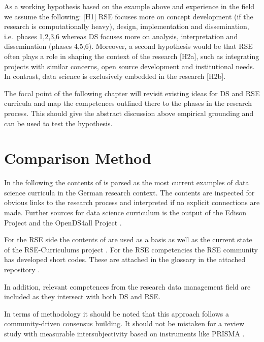 \documentclass[
        english,biblatex
    ]{lni}
\begin{document}
    As a working hypothesis based on the example above and experience in
    the field we assume the following: {[}H1{]} RSE focuses more on
    concept development (if the research is computationally heavy),
    design, implementation and dissemination, i.e.~phases 1,2,3,6
    whereas DS focuses more on analysis, interpretation and
    dissemination (phases 4,5,6). Moreover, a second hypothesis would be
    that RSE often plays a role in shaping the context of the research
    {[}H2a{]}, such as integrating projects with similar concerns, open
    source development and institutional needs. In contrast, data
    science is exclusively embedded in the research {[}H2b{]}.

    The focal point of the following chapter will revisit existing ideas
    for DS and RSE curricula and map the competences outlined there to
    the phases in the research process. This should give the abstract
    discussion above empirical grounding and can be used to test the
    hypothesis.

    \section{Comparison Method}\label{comparison-method}

    In the following the contents of \autocite{GI2021DataScience} is
    parsed as the most current examples of data science curricula in the
    German research context. The contents are inspected for obvious
    links to the research process and interpreted if no explicit
    connections are made. Further sources for data science curriculum is
    the output of the Edison Project \autocite{EDSF2017} and the
    OpenDS4all Project \autocite{OpenDS4All2020}.

    For the RSE side the contents of \autocite{Goth2024RSE} are used as
    a basis as well as the current state of the RSE-Curriculums project
    \autocite{RSECurriculums2021}. For the RSE competencies the RSE
    community has developed short codes. These are attached in the
    glossary in the attached repository \autocite{ds2rse2025}.

    In addition, relevant competences from the research data management
    field \autocite{petersen_2025_15025246} are included as they
    intersect with both DS and RSE.

    In terms of methodology it should be noted that this approach
    follows a community-driven consensus building. It should not be
    mistaken for a review study with measurable intersubjectivity based
    on instruments like PRISMA \autocite{Page2021PRISMA}.
\end{document}
